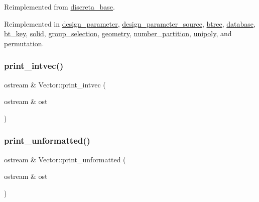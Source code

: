 Reimplemented from \mbox{\hyperlink{classdiscreta__base_a036e48bc058347046fc9b73dd0951478}{discreta\+\_\+base}}.



Reimplemented in \mbox{\hyperlink{classdesign__parameter_ac9c431a5408809b0c229eacaa924781b}{design\+\_\+parameter}}, \mbox{\hyperlink{classdesign__parameter__source_a50fb37085011959ea40a4087353377b4}{design\+\_\+parameter\+\_\+source}}, \mbox{\hyperlink{classbtree_a76cbc154a13a6464d16a7f080cef40d3}{btree}}, \mbox{\hyperlink{classdatabase_a55930857986406ef0650509001c7af76}{database}}, \mbox{\hyperlink{classbt__key_aee0bad4deaf27c20d15d97050d3af150}{bt\+\_\+key}}, \mbox{\hyperlink{classsolid_a0afe4403778d31d092e2a66c13a9a365}{solid}}, \mbox{\hyperlink{classgroup__selection_a522bc3a2346d1031fbb82f5a4d0b29cc}{group\+\_\+selection}}, \mbox{\hyperlink{classgeometry_af92f963887d22dd3437f585df929208d}{geometry}}, \mbox{\hyperlink{classnumber__partition_a53c6c54cf4d86da0f07789ae14ff6da5}{number\+\_\+partition}}, \mbox{\hyperlink{classunipoly_a9dc0d295bea73d0c20562149f250cd97}{unipoly}}, and \mbox{\hyperlink{classpermutation_a3a4c219748ab79362fd440bea839c094}{permutation}}.

\mbox{\label{class_vector_af01e693b8e8a98f191b3690ef3547267}} 
\subsubsection{\texorpdfstring{print\+\_\+intvec()}{print\_intvec()}}
{\footnotesize\ttfamily ostream \& Vector\+::print\+\_\+intvec (\begin{DoxyParamCaption}\item[{ostream \&}]{ost }\end{DoxyParamCaption})}

\mbox{\label{class_vector_ad42c035ccb0c95544d2a4af4abaad30c}} 
\subsubsection{\texorpdfstring{print\+\_\+unformatted()}{print\_unformatted()}}
{\footnotesize\ttfamily ostream \& Vector\+::print\+\_\+unformatted (\begin{DoxyParamCaption}\item[{ostream \&}]{ost }\end{DoxyParamCaption})}

